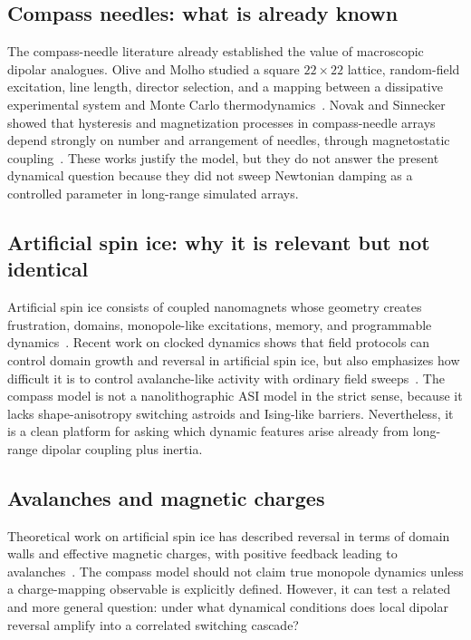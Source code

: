 \documentclass[11pt,a4paper]{article}
\begin{document}
\subsection{Compass needles: what is already known}

The compass-needle literature already established the value of macroscopic dipolar analogues. Olive and Molho studied a square $22\times22$ lattice, random-field excitation, line length, director selection, and a mapping between a dissipative experimental system and Monte Carlo thermodynamics~\cite{olive1998}. Novak and Sinnecker showed that hysteresis and magnetization processes in compass-needle arrays depend strongly on number and arrangement of needles, through magnetostatic coupling~\cite{novak2004}. These works justify the model, but they do not answer the present dynamical question because they did not sweep Newtonian damping as a controlled parameter in long-range simulated arrays.

\subsection{Artificial spin ice: why it is relevant but not identical}

Artificial spin ice consists of coupled nanomagnets whose geometry creates frustration, domains, monopole-like excitations, memory, and programmable dynamics~\cite{nisoli2013,skjaervoe2020}. Recent work on clocked dynamics shows that field protocols can control domain growth and reversal in artificial spin ice, but also emphasizes how difficult it is to control avalanche-like activity with ordinary field sweeps~\cite{jensen2024}. The compass model is not a nanolithographic ASI model in the strict sense, because it lacks shape-anisotropy switching astroids and Ising-like barriers. Nevertheless, it is a clean platform for asking which dynamic features arise already from long-range dipolar coupling plus inertia.

\subsection{Avalanches and magnetic charges}

Theoretical work on artificial spin ice has described reversal in terms of domain walls and effective magnetic charges, with positive feedback leading to avalanches~\cite{mellado2010}. The compass model should not claim true monopole dynamics unless a charge-mapping observable is explicitly defined. However, it can test a related and more general question: under what dynamical conditions does local dipolar reversal amplify into a correlated switching cascade?
\end{document}

